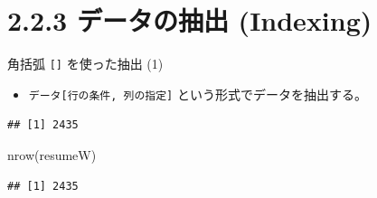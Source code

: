 \documentclass[
  ignorenonframetext,
]{beamer}
\newenvironment{Shaded}{\begin{snugshade}}{\end{snugshade}}
\newcommand{\CommentTok}[1]{\textcolor[rgb]{0.56,0.35,0.01}{\textit{#1}}}
\newcommand{\FunctionTok}[1]{\textcolor[rgb]{0.00,0.00,0.00}{#1}}
\newcommand{\NormalTok}[1]{#1}
\newcommand{\OtherTok}[1]{\textcolor[rgb]{0.56,0.35,0.01}{#1}}
\newcommand{\SpecialCharTok}[1]{\textcolor[rgb]{0.00,0.00,0.00}{#1}}
\newcommand{\StringTok}[1]{\textcolor[rgb]{0.31,0.60,0.02}{#1}}
\providecommand{\tightlist}{%
  \setlength{\itemsep}{0pt}\setlength{\parskip}{0pt}}
\begin{document}
\hypertarget{ux30c7ux30fcux30bfux306eux62bdux51fa-indexing}{%
\section{2.2.3 データの抽出
(Indexing)}\label{ux30c7ux30fcux30bfux306eux62bdux51fa-indexing}}

\begin{frame}[fragile]{角括弧 \texttt{{[}{]}} を使った抽出 (1)}
\protect\hypertarget{ux89d2ux62ecux5f27-ux3092ux4f7fux3063ux305fux62bdux51fa-1}{}
\begin{itemize}
\tightlist
\item
  \texttt{データ{[}行の条件,\ 列の指定{]}}
  という形式でデータを抽出する。
\end{itemize}

\scriptsize

\begin{Shaded}
\end{Shaded}

\begin{verbatim}
## [1] 2435
\end{verbatim}

\begin{Shaded}
\begin{Highlighting}[]
\FunctionTok{nrow}\NormalTok{(resumeW)}
\end{Highlighting}
\end{Shaded}

\begin{verbatim}
## [1] 2435
\end{verbatim}

\normalsize
\end{frame}
\end{document}
